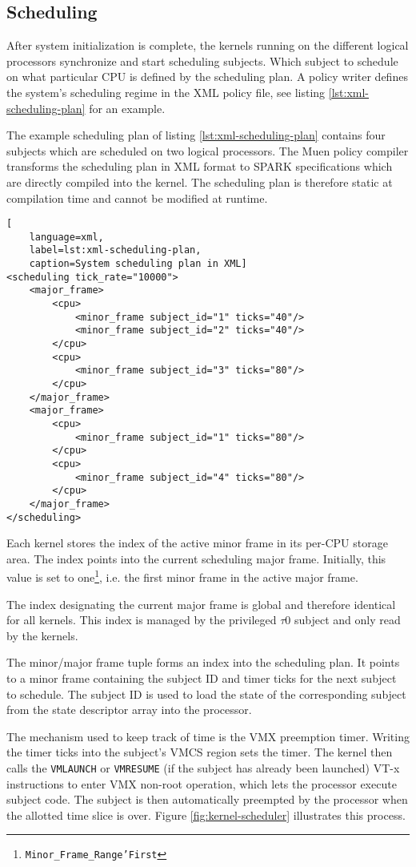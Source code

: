 \subsection{Scheduling}\label{subsec:scheduling}
After system initialization is complete, the kernels running on the different
logical processors synchronize and start scheduling subjects. Which subject to
schedule on what particular CPU is defined by the scheduling plan. A policy
writer defines the system's scheduling regime in the XML policy file, see
listing \ref{lst:xml-scheduling-plan} for an example.

The example scheduling plan of listing \ref{lst:xml-scheduling-plan} contains
four subjects which are scheduled on two logical processors. The Muen policy
compiler transforms the scheduling plan in XML format to SPARK specifications
which are directly compiled into the kernel. The scheduling plan is therefore
static at compilation time and cannot be modified at runtime.

\begin{lstlisting}[
	language=xml,
	label=lst:xml-scheduling-plan,
	caption=System scheduling plan in XML]
<scheduling tick_rate="10000">
	<major_frame>
		<cpu>
			<minor_frame subject_id="1" ticks="40"/>
			<minor_frame subject_id="2" ticks="40"/>
		</cpu>
		<cpu>
			<minor_frame subject_id="3" ticks="80"/>
		</cpu>
	</major_frame>
	<major_frame>
		<cpu>
			<minor_frame subject_id="1" ticks="80"/>
		</cpu>
		<cpu>
			<minor_frame subject_id="4" ticks="80"/>
		</cpu>
	</major_frame>
</scheduling>
\end{lstlisting}

Each kernel stores the index of the active minor frame in its per-CPU storage
area. The index points into the current scheduling major frame. Initially, this
value is set to one\footnote{\texttt{Minor\_Frame\_Range'First}}, i.e. the
first minor frame in the active major frame.

The index designating the current major frame is global and therefore identical
for all kernels. This index is managed by the privileged $\tau$0 subject and
only read by the kernels.

The minor/major frame tuple forms an index into the scheduling plan. It points
to a minor frame containing the subject ID and timer ticks for the next subject
to schedule. The subject ID is used to load the state of the corresponding
subject from the state descriptor array into the processor.

The mechanism used to keep track of time is the VMX preemption timer. Writing
the timer ticks into the subject's VMCS region sets the timer. The kernel then
calls the \texttt{VMLAUNCH} or \texttt{VMRESUME} (if the subject has already
been launched) VT-x instructions to enter VMX non-root operation, which lets the
processor execute subject code.  The subject is then automatically preempted by
the processor when the allotted time slice is over. Figure
\ref{fig:kernel-scheduler} illustrates this process.

